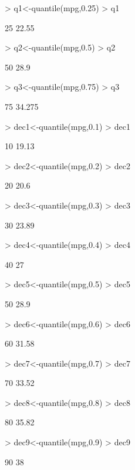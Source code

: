 \documentclass [a4paper] {article}
\begin{document}
\begin{Schunk}
\begin{Sinput}
> q1<-quantile(mpg,0.25)
> q1 
\end{Sinput}
\begin{Soutput}
  25%
22.55 
\end{Soutput}
\begin{Sinput}
> q2<-quantile(mpg,0.5)
> q2
\end{Sinput}
\begin{Soutput}
 50%
28.9 
\end{Soutput}
\begin{Sinput}
> q3<-quantile(mpg,0.75)
> q3 
\end{Sinput}
\begin{Soutput}
   75%
34.275 
\end{Soutput}
\begin{Sinput}
> dec1<-quantile(mpg,0.1)
> dec1
\end{Sinput}
\begin{Soutput}
  10%
19.13 
\end{Soutput}
\begin{Sinput}
> dec2<-quantile(mpg,0.2)
> dec2
\end{Sinput}
\begin{Soutput}
 20%
20.6 
\end{Soutput}
\begin{Sinput}
> dec3<-quantile(mpg,0.3)
> dec3
\end{Sinput}
\begin{Soutput}
  30%
23.89 
\end{Soutput}
\begin{Sinput}
> dec4<-quantile(mpg,0.4)
> dec4
\end{Sinput}
\begin{Soutput}
40%
 27 
\end{Soutput}
\begin{Sinput}
> dec5<-quantile(mpg,0.5)
> dec5
\end{Sinput}
\begin{Soutput}
 50%
28.9 
\end{Soutput}
\begin{Sinput}
> dec6<-quantile(mpg,0.6)
> dec6
\end{Sinput}
\begin{Soutput}
  60%
31.58 
\end{Soutput}
\begin{Sinput}
> dec7<-quantile(mpg,0.7)
> dec7
\end{Sinput}
\begin{Soutput}
  70%
33.52 
\end{Soutput}
\begin{Sinput}
> dec8<-quantile(mpg,0.8)
> dec8
\end{Sinput}
\begin{Soutput}
  80%
35.82 
\end{Soutput}
\begin{Sinput}
> dec9<-quantile(mpg,0.9)
> dec9 
\end{Sinput}
\begin{Soutput}
90%
 38 
\end{Soutput}
\end{Schunk}
\end{document}
